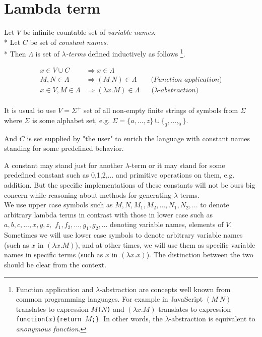 \documentclass[12pt,a4paper]{report}
\newcommand{\lterm}{$\lambda$-term\xspace}
\newcommand{\lterms}{$\lambda$-terms\xspace}
\newcommand{\setDots}[2]{ 
	\lbrace #1 , \dots , #2 \rbrace
}
\begin{document}
\newpage		
\section{Lambda term}
\label{deflam}

\newcommand{\then}{\Rightarrow\xspace}

\newcommand{\lamb}[2]{( \lambda #1 . #2 )}
\newcommand{\lam}[2]{\lambda #1 . #2}

Let $V$ be infinite countable set of {\it 
variable names}.  \\* 
Let $C$ be set of {\it constant names}.	 \\*		
Then $\Lambda$ is set of {\it \lterms} defined inductively as follows
\footnote{Function application and $\lambda$-abstraction are concepts
well known from common programming languages. 
For example in JavaScript 
$(M~N)$ translates to expression \texttt{$M$($N$)} and
$\lamb{x}{M}$ translates to expression \texttt{function($x$)\{return $M$;\}}.
In other words, the $\lambda$-abstraction is equivalent to 
\textit{anonymous function}. 
}.

	
\begin{align*}
x   \in V \cup C  &\then x     \in \Lambda \\
M,N \in \Lambda   &\then (M~N) \in \Lambda 
\textit{~~~~~~(Function application)} \\
x   \in V , M \in \Lambda &\then \lamb{x}{M} \in \Lambda
\textit{~~~~~($\lambda$-abstraction)} 
\end{align*}
\\
It is usual to use $V = \Sigma^+$ set of all non-empty finite strings of symbols 
from $\Sigma$ where $\Sigma$ is some alphabet set, e.g.  
$
\Sigma =
\setDots{a}{z} \cup 
\setDots{_0}{_9} $.

And $C$ is set supplied by "the user" to enrich 
the language with constant names standing
for some predefined behavior.

A constant may stand just for another \lterm
or it may stand for some predefined constant 
such as 0,1,2,... and primitive operations on
them, e.g. addition. 
But the specific implementations 
of these constants will not be ours big concern 
while reasoning about methods for generating 
\lterms .\\

We use upper case symbols such as 
$M,N,M_1,M_2,...,N_1,N_2,...$
to denote arbitrary lambda terms in contrast with
those in lower case such as
$a,b,c,...,x,y,z,$
$f_1,f_2,...,g_1,g_2,...$
denoting variable names, elements of $V$.
Sometimes we will use lower case symbols
to denote arbitrary variable names (such as
$x$ in $\lamb{x}{M}$),
and at other times, we will use them
as specific variable names in specific terms 
(such as $x$ in $\lamb{x}{x}$).
The distinction between the two should be
clear from the context.\\
	
\end{document}
